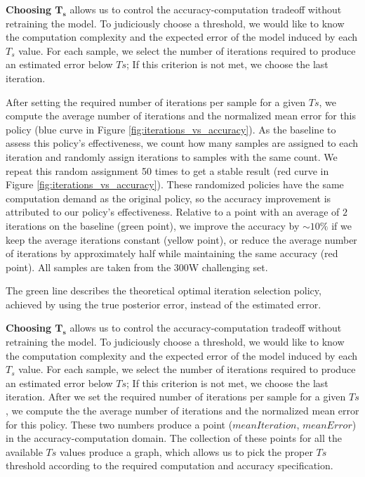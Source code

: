 \documentclass[twocolumn]{article}
\begin{document}
\textbf{Choosing $\mathbf{T_s}$} allows us to control the accuracy-computation tradeoff without retraining the model. To judiciously choose a threshold, we would like to know the computation complexity and the expected error of the model induced by each $T_s$ value. For each sample, we select the number of iterations required to produce an estimated error below $Ts$; If this criterion is not met, we choose the last iteration.

After setting the required number of iterations per sample for a given $Ts$, we compute the average number of iterations and the normalized mean error for this policy (blue curve in Figure \ref{fig:iterations_vs_accuracy}). As the baseline to assess this policy's effectiveness, we count how many samples are assigned to each iteration and randomly assign iterations to samples with the same count. We repeat this random assignment 50 times to get a stable result (red curve in Figure \ref{fig:iterations_vs_accuracy}). These randomized policies have the same computation demand as the original policy, so the accuracy improvement is attributed to our policy's effectiveness. Relative to a point with an average of $2$ iterations on the baseline (green point), we improve the accuracy by $\sim10\%$ if we keep the average iterations constant (yellow point), or reduce the average number of iterations by approximately half while maintaining the same accuracy (red point). All samples are taken from the 300W challenging set.

The green line describes the theoretical optimal iteration selection policy, achieved by using the true posterior error, instead of the estimated error.

\iffalse
\textbf{Choosing $\mathbf{T_s}$} allows us to control the accuracy-computation tradeoff without retraining the model. To judiciously choose a threshold, we would like to know the computation complexity and the expected error of the model induced by each $T_s$ value. For each sample, we select the number of iterations required to produce an estimated error below $Ts$; If this criterion is not met, we choose the last iteration.
After we set the required number of iterations per sample for a given $Ts$, we compute the the average number of iterations and the normalized mean error for this policy. These two numbers produce a point ($meanIteration$, $mean Error$) in the accuracy-computation domain. The collection of these points for all the available $Ts$ values produce a graph, which allows us to pick the proper $Ts$ threshold according to the required computation and accuracy specification.
\end{document}
